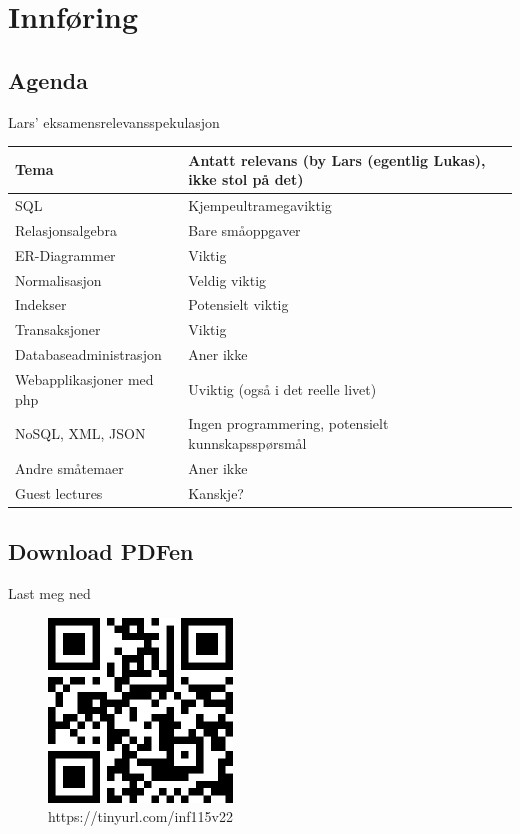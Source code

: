 
\begin{frame}[t,plain]
    \titlepage
\end{frame}

\section{Innføring}
\subsection*{Agenda}
\begin{frame}
    \tableofcontents
\end{frame}

\begin{frame}{Lars' eksamensrelevansspekulasjon}
    \begin{tabular}{l|l}
    Tema & Antatt relevans (by Lars (egentlig Lukas), ikke stol på det)\\\hline\pause
    SQL & Kjempeultramegaviktig\\\pause
    Relasjonsalgebra & Bare småoppgaver\\\pause
    ER-Diagrammer & Viktig\\\pause
    Normalisasjon & Veldig viktig\\\pause
    Indekser & Potensielt viktig\\\pause
    Transaksjoner & Viktig\\\pause
    Databaseadministrasjon & Aner ikke\\\pause
    Webapplikasjoner med php & Uviktig (også i det reelle livet)\\\pause
    NoSQL, XML, JSON & Ingen programmering, potensielt kunnskapsspørsmål\\\pause
    Andre småtemaer & Aner ikke\\\pause
    Guest lectures & Kanskje?
    \end{tabular}
\end{frame}

\subsection*{Download PDFen}
\begin{frame}{Last meg ned}
    \begin{figure}
        \centering
        \includegraphics[height = 4.9cm]{images/downloadqr.png}
        \caption{https://tinyurl.com/inf115v22}
        \label{fig:qrcode}
    \end{figure}
\end{frame}


